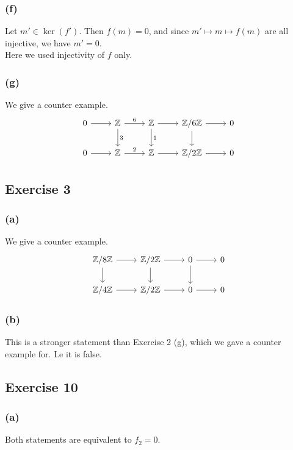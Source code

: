 \documentclass{article}
\theoremstyle{definition}
\newcommand{\Z}{\mathbb{Z}}
\begin{document}
\subsubsection*{(f)}

Let $m' \in \ker(f')$. Then $f(m) = 0$, and since $m' \mapsto m \mapsto f(m)$
are all injective, we have $m' = 0$. \\

Here we used injectivity of $f$ only.

\subsubsection*{(g)}

We give a counter example.
\[
\begin{tikzcd}
    0 
	\arrow{r} 
	& 
	\mathbb{\Z} 
	\arrow{r}{6}
	\arrow{d}{3} 
	& 
	\Z
	\arrow{r}
	\arrow{d}{1} 
	& 
	\Z/6\Z
	\arrow{r}
	\arrow{d} 
	& 
	0 \\
    0
	\arrow{r} 
	& 
	\Z
	\arrow{r}{2} 
	& 
	\Z
	\arrow{r}
	& 
	\Z/2\Z
	\arrow{r} 
	& 
	0
\end{tikzcd}
\]

\subsection*{Exercise 3}
\subsubsection*{(a)}

We give a counter example.
\[
\begin{tikzcd}
	\Z/8\Z
	\arrow{r}
	\arrow{d} 
	& 
	\Z/2\Z
	\arrow{r}
	\arrow{d}
	& 
	0
	\arrow{r}
	\arrow{d} 
	& 
	0 \\
	\Z/4\Z
	\arrow{r}
	&
	\Z/2\Z
	\arrow{r}
	& 
	0
	\arrow{r} 
	& 
	0
\end{tikzcd}
\]

\subsubsection*{(b)}

This is a stronger statement than Exercise 2 (g), which we gave a counter example for. I.e
it is false.

\subsection*{Exercise 10}

\subsubsection*{(a)}
Both statements are equivalent to $f_2 = 0$.
\end{document}
